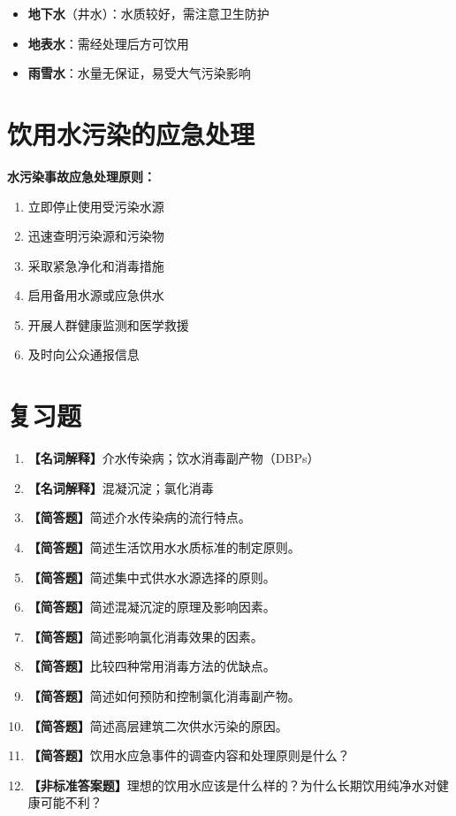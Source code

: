 \begin{itemize}[leftmargin=*]
    \item \textbf{地下水}（井水）：水质较好，需注意卫生防护
    \item \textbf{地表水}：需经处理后方可饮用
    \item \textbf{雨雪水}：水量无保证，易受大气污染影响
\end{itemize}

\section{饮用水污染的应急处理}

\textbf{水污染事故应急处理原则：}
\begin{enumerate}[leftmargin=*]
    \item 立即停止使用受污染水源
    \item 迅速查明污染源和污染物
    \item 采取紧急净化和消毒措施
    \item 启用备用水源或应急供水
    \item 开展人群健康监测和医学救援
    \item 及时向公众通报信息
\end{enumerate}

\section{复习题}

\begin{enumerate}[leftmargin=*, itemsep=8pt]
    \item \textbf{【名词解释】}介水传染病；饮水消毒副产物（DBPs）
    \item \textbf{【名词解释】}混凝沉淀；氯化消毒
    \item \textbf{【简答题】}简述介水传染病的流行特点。
    \item \textbf{【简答题】}简述生活饮用水水质标准的制定原则。
    \item \textbf{【简答题】}简述集中式供水水源选择的原则。
    \item \textbf{【简答题】}简述混凝沉淀的原理及影响因素。
    \item \textbf{【简答题】}简述影响氯化消毒效果的因素。
    \item \textbf{【简答题】}比较四种常用消毒方法的优缺点。
    \item \textbf{【简答题】}简述如何预防和控制氯化消毒副产物。
    \item \textbf{【简答题】}简述高层建筑二次供水污染的原因。
    \item \textbf{【简答题】}饮用水应急事件的调查内容和处理原则是什么？
    \item \textbf{【非标准答案题】}理想的饮用水应该是什么样的？为什么长期饮用纯净水对健康可能不利？
\end{enumerate}

